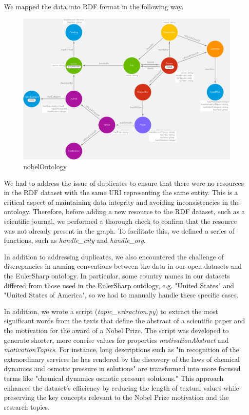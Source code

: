 \documentclass{article}
\begin{document}
\noindent We mapped the data into RDF format in the following way.

\begin{figure}[ht]
    \centering
    \includegraphics[width=\textwidth]{NobelOntology.png}
    \caption{nobelOntology}
    \label{fig:nobelOntology}
\end{figure}

\newpage

\noindent We had to address the issue of duplicates to ensure that there were no resources in the RDF dataset with the same URI representing the same
entity. This is a critical aspect of maintaining data integrity and avoiding inconsistencies in the ontology. Therefore, before adding a new resource to
the RDF dataset, such as a scientific journal, we performed a thorough check to confirm that the resource was not already present in the graph.
To facilitate this, we defined a series of functions, such as \textit{handle\_city} and \textit{handle\_org}.

\noindent In addition to addressing duplicates, we also encountered the challenge of discrepancies in naming conventions between the data in our open
datasets and the EulerSharp ontology. In particular, some country names in our datasets differed from those used in the EulerSharp ontology, e.g. "United
States" and "United States of America", so we had to manually handle these specific cases.

\noindent In addition, we wrote a script (\textit{topic\_extraction.py}) to extract the most significant words from the texts that define the abstract of a
scientific paper and the motivation for the award of a Nobel Prize. The script was developed to generate shorter, more concise values for properties
\textit{motivationAbstract} and \textit{motivationTopics}. For instance, long descriptions such as "in recognition of the extraordinary services he has rendered by the
discovery of the laws of chemical dynamics and osmotic pressure in solutions" are transformed into more focused terms like "chemical dynamics osmotic
pressure solutions." This approach enhances the dataset's efficiency by reducing the length of textual values while preserving the key concepts relevant
to the Nobel Prize motivation and the research topics.
\end{document}
